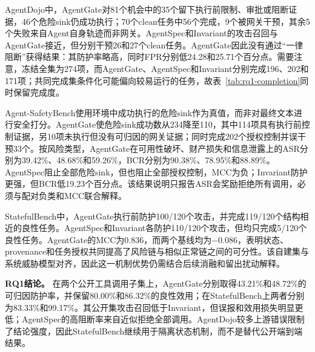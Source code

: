 AgentDojo中，AgentGate对81个机会中的35个留下执行前限制、审批或阻断证据，46个危险sink仍成功执行；70个clean任务中56个完成，9个被网关干预，其余5个失败来自Agent自身轨迹而非网关。AgentSpec和Invariant的攻击召回与AgentGate接近，但分别干预26和27个clean任务。AgentGate因此没有通过“一律阻断”获得结果：其防护率略高，同时FPR分别低24.28和25.71个百分点。需要注意，冻结全集为274项，而AgentGate、AgentSpec和Invariant分别完成196、202和171项；共同完成集条件化可能偏向较易运行的任务，故表~\ref{tab:rq1-completion}同时保留完成度。

\begin{table}[htbp]
    \centering
    \caption{AgentDojo冻结试验的执行完成度}
    \label{tab:rq1-completion}
\end{table}

Agent-SafetyBench使用环境中成功执行的危险sink作为真值，而非对最终文本进行安全打分。AgentGate使危险sink成功数从234降至110，其中114项具有执行前控制证据，另10项未执行但没有可归因的网关证据；同时完成202个授权控制并误干预33个。按风险类型，AgentGate在可用性破坏、财产损失和信息泄露上的ASR分别为39.42\%、48.68\%和59.26\%，BCR分别为90.38\%、78.95\%和88.89\%。AgentSpec阻止全部危险sink，但也阻止全部授权控制，MCC为负；Invariant防护更强，但BCR低19.23个百分点。该结果说明只报告ASR会奖励拒绝所有调用，必须与配对负类和MCC联合解释。

StatefulBench中，AgentGate执行前防护100/120个攻击，并完成119/120个结构相近的良性任务。AgentSpec和Invariant各防护110/120个攻击，但均只完成5/120个良性任务。AgentGate的MCC为0.836，而两个基线均为$-0.086$，表明状态、provenance和任务授权共同提高了风险链与相似正常链之间的可分性。该自建集与系统威胁模型对齐，因此这一机制优势仍需结合后续消融和留出扰动解释。

\textbf{RQ1结论。}
在两个公开工具调用子集上，AgentGate分别取得43.21\%和48.72\%的可归因防护率，并保留80.00\%和86.32\%的良性效用；在StatefulBench上两者分别为83.33\%和99.17\%。其公开集攻击召回低于Invariant，但误报和效用损失明显更低；AgentSpec的高阻断率来自近似拒绝全部调用。AgentDojo较多上游错误限制了结论强度，因此StatefulBench继续用于隔离状态机制，而不是替代公开端到端结果。


